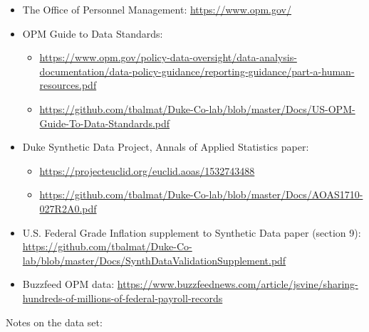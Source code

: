 \documentclass[10pt, letterpaper]{article}
\begin{document}
\begin{spacing}{1.0}
\begin{itemize}
    \item The Office of Personnel Management:  \url{https://www.opm.gov/}
    \item OPM Guide to Data Standards:
    \begin{itemize}
        \item
        \url{https://www.opm.gov/policy-data-oversight/data-analysis-documentation/data-policy-guidance/reporting-guidance/part-a-human-resources.pdf}
        \item \url{https://github.com/tbalmat/Duke-Co-lab/blob/master/Docs/US-OPM-Guide-To-Data-Standards.pdf}
    \end{itemize}
    \item Duke Synthetic Data Project, Annals of Applied Statistics paper:
    \begin{itemize}
        \item \url{https://projecteuclid.org/euclid.aoas/1532743488}
        \item \url{https://github.com/tbalmat/Duke-Co-lab/blob/master/Docs/AOAS1710-027R2A0.pdf}
    \end{itemize}
    \item U.S. Federal Grade Inflation supplement to Synthetic Data paper (section 9):  \url{https://github.com/tbalmat/Duke-Co-lab/blob/master/Docs/SynthDataValidationSupplement.pdf}
    \item Buzzfeed OPM data:
    \small
    \url{https://www.buzzfeednews.com/article/jsvine/sharing-hundreds-of-millions-of-federal-payroll-records}
    \normalsize
\end{itemize}

\vspace{0.25in}

Notes on the data set:


\end{spacing}
\end{document}
